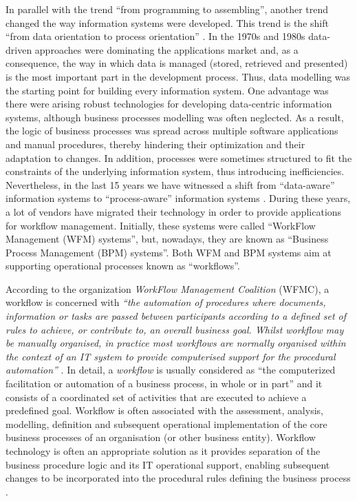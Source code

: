 In parallel with the trend ``from programming to assembling'', another trend
changed the way information systems were developed. This trend is the shift ``from
data orientation to process orientation'' \cite{DumasAalst2005}. In the 1970s and 1980s 
data-driven approaches were dominating
the applications market and, as a consequence, the way in which data is managed (stored, retrieved and presented) 
is the most important part in the development process. Thus, data
modelling was the starting point for building every information system. One advantage was there were arising
robust technologies for developing data-centric information systems, although 
business processes modelling was often neglected. As a 
result, the logic of business processes was spread across multiple software
applications and manual procedures, thereby hindering their optimization and their
adaptation to changes. In addition, processes were sometimes structured to fit the
constraints of the underlying information system, thus introducing inefficiencies.
Nevertheless, in the last 15 years we have witnessed a shift from ``data-aware'' 
information systems to ``process-aware'' information systems \cite{DumasAalst2005}.
During these years, a lot of vendors have migrated their technology in order to provide applications
for workflow management. Initially, these systems were called ``WorkFlow Management (WFM) systems'', but, nowadays,
they are known as ``Business Process Management (BPM) systems''. Both WFM and BPM systems aim at supporting operational
processes known as ``workflows''.

According to the organization \emph{WorkFlow Management Coalition} (WFMC), 
a workflow is concerned with \emph{``the automation of procedures where documents, information or tasks are passed
between participants according to a defined set of rules to achieve, or contribute to, an overall business goal.
Whilst workflow may be manually organised, in practice most workflows are normally
organised within the context of an IT system to provide
computerised support for the procedural automation''} \cite{Hollingsworth2004}.
In detail, a \emph{workflow} is usually considered as ``the computerized facilitation or automation of a
business process, in whole or in part'' \cite{EllisKeddara2000} and it consists 
of a coordinated set of activities that are executed to achieve a predefined goal. Workflow is often associated with the assessment,
analysis, modelling, definition and subsequent operational implementation of the core business processes of an
organisation (or other business entity). Workflow technology is 
often an appropriate solution as it provides separation of the business procedure logic
and its IT operational support, enabling subsequent changes to be incorporated into the procedural rules
defining the business process \cite{DumasAalst2005}.

